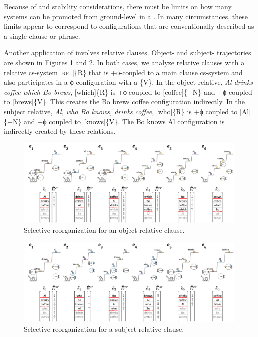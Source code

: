   Because of  and stability considerations, there must be limits on how many systems can be promoted from ground-level in a . In many circumstances, these limits appear to correspond to configurations that are conventionally described as a single clause or  phrase.

  Another application of  involves relative clauses. Ob\-ject- and subject- trajectories are shown in Figures {\ref{fig:4:52}} and {\ref{fig:4:53}}. In both cases, we analyze relative clauses with a relative cs-system [\textsc{rel}]\{R\} that is +ϕ-coupled to a main clause cs-system and also participates in a ϕ-con\-fig\-u\-ra\-tion with a  \{V\}. In the object relative, \textit{Al drinks coffee which Bo brews}, [which]\{R\} is +ϕ coupled to [coffee]\{−N\} and −ϕ coupled to [brews]\{V\}. This creates the {\textbar}Bo brews coffee{\textbar} configuration indirectly. In the subject relative, \textit{Al, who Bo knows, drinks coffee}, [who]\{R\} is +ϕ coupled to [Al]\{+N\} and −ϕ coupled to [knows]\{V\}. The {\textbar}Bo knows Al{\textbar} configuration is indirectly created by these relations.

  
\begin{figure}
\includegraphics[width=\textwidth]{figures/Tilsen-img102.png}
\caption{Selective reorganization for an object relative clause.}
\label{fig:4:52}
\end{figure}
 

  
\begin{figure}
\includegraphics[width=\textwidth]{figures/Tilsen-img103.png}
\caption{Selective reorganization for a subject relative clause.}
\label{fig:4:53}
\end{figure}
 

